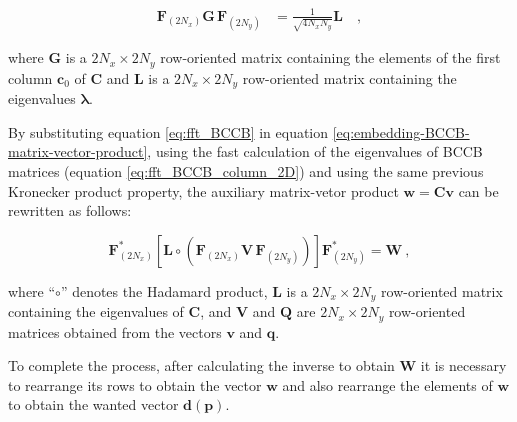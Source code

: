 \documentclass[manuscript,revised]{geophysics}
\begin{document}
\begin{eqnarray}
\mathbf{F}_{(2N_x)} \mathbf{G} \, \mathbf{F}_{(2N_y)} &= \frac{1}{\sqrt{4N_xN_y}} \mathbf{L}
\quad ,
\label{eq:fft_BCCB_column_2D}
\end{eqnarray}

\noindent where $\mathbf{G}$ is a $2N_x \times 2N_y$ row-oriented matrix containing the elements of the first column $\mathbf{c}_{0}$ of $\mathbf{C}$ and $\mathbf{L}$ is a $2N_x \times 2N_y$ row-oriented matrix containing the eigenvalues $\mathbf{\lambda}$.

By substituting equation \ref{eq:fft_BCCB} in equation \ref{eq:embedding-BCCB-matrix-vector-product}, using the fast calculation of the eigenvalues of BCCB matrices (equation \ref{eq:fft_BCCB_column_2D}) and using the same previous Kronecker product property, the auxiliary matrix-vetor product $\mathbf{w} = \mathbf{C} \mathbf{v}$ can be rewritten as follows:

\begin{equation}
\mathbf{F}_{(2 N_x)}^{\ast} \left[ \mathbf{L} \circ \left( \mathbf{F}_{(2N_x)} \mathbf{V} \, \mathbf{F}_{(2N_y)} \right) \right] \mathbf{F}_{(2N_y)}^{\ast} = \mathbf{W} \: ,
\label{eq:fft_q}
\end{equation}

\noindent where ``$\circ$'' denotes the Hadamard product, $\mathbf{L}$ is a $2N_x \times 2N_y$ row-oriented matrix containing the eigenvalues of $\mathbf{C}$, and $\mathbf{V}$ and $\mathbf{Q}$ are $2N_x \times 2N_y$ row-oriented matrices obtained from the vectors $\mathbf{v}$ and $\mathbf{q}$.



To complete the process, after calculating the inverse to obtain $\mathbf{W}$ it is necessary to rearrange its rows to obtain the vector $\mathbf{w}$ and also rearrange the elements of $\mathbf{w}$ to obtain the wanted vector $\mathbf{d(p)}$.




\end{document}
